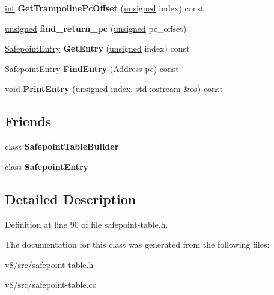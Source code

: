 \begin{DoxyCompactItemize}
\item 
\mbox{\label{classv8_1_1internal_1_1SafepointTable_a5ad328253c9d06e15e759e55bb42c1de}} 
\mbox{\hyperlink{classint}{int}} {\bfseries Get\+Trampoline\+Pc\+Offset} (\mbox{\hyperlink{classunsigned}{unsigned}} index) const
\item 
\mbox{\label{classv8_1_1internal_1_1SafepointTable_abeb3a7e74a15ada419ed0eb5ccb97d3e}} 
\mbox{\hyperlink{classunsigned}{unsigned}} {\bfseries find\+\_\+return\+\_\+pc} (\mbox{\hyperlink{classunsigned}{unsigned}} pc\+\_\+offset)
\item 
\mbox{\label{classv8_1_1internal_1_1SafepointTable_a8eb5981b546e85db6eb0c1831a3570a9}} 
\mbox{\hyperlink{classv8_1_1internal_1_1SafepointEntry}{Safepoint\+Entry}} {\bfseries Get\+Entry} (\mbox{\hyperlink{classunsigned}{unsigned}} index) const
\item 
\mbox{\label{classv8_1_1internal_1_1SafepointTable_a894fd386f9558cdcc2f990e1046ef7e6}} 
\mbox{\hyperlink{classv8_1_1internal_1_1SafepointEntry}{Safepoint\+Entry}} {\bfseries Find\+Entry} (\mbox{\hyperlink{classuintptr__t}{Address}} pc) const
\item 
\mbox{\label{classv8_1_1internal_1_1SafepointTable_a91c7c6cfa3de15549e09c5a82423b573}} 
void {\bfseries Print\+Entry} (\mbox{\hyperlink{classunsigned}{unsigned}} index, std\+::ostream \&os) const
\end{DoxyCompactItemize}
\subsection*{Friends}
\begin{DoxyCompactItemize}
\item 
\mbox{\label{classv8_1_1internal_1_1SafepointTable_a2d6731928ba3d3e308c38b4cbd451264}} 
class {\bfseries Safepoint\+Table\+Builder}
\item 
\mbox{\label{classv8_1_1internal_1_1SafepointTable_aa1dc7cacd9db879099a26b9e27b6918b}} 
class {\bfseries Safepoint\+Entry}
\end{DoxyCompactItemize}


\subsection{Detailed Description}


Definition at line 90 of file safepoint-\/table.\+h.



The documentation for this class was generated from the following files\+:\begin{DoxyCompactItemize}
\item 
v8/src/safepoint-\/table.\+h\item 
v8/src/safepoint-\/table.\+cc\end{DoxyCompactItemize}
